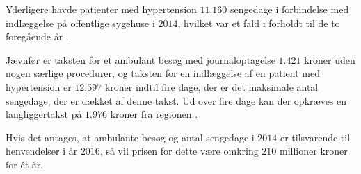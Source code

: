 \noindent
Yderligere havde patienter med hypertension $11.160$ sengedage i forbindelse med indlæggelse på offentlige sygehuse i $2014$, hvilket var et fald i forholdt til de to foregående år \citep{sundhedsdatastyrelsen2016}. 

Jævnfør \citeauthor{takstvejledning2016} er taksten for et ambulant besøg  med journaloptagelse $1.421$ kroner uden nogen særlige procedurer, og taksten for en indlæggelse af en patient med hypertension er $12.597$ kroner indtil fire dage, der er det maksimale antal sengedage, der er dækket af denne takst. Ud over fire dage kan der opkræves en langliggertakst på $1.976$ kroner fra regionen \citep{takstvejledning2016}. 

Hvis det antages, at ambulante besøg og antal sengedage i $2014$ er tilsvarende til henvendelser i år $2016$, så vil prisen for dette være omkring $210$ millioner kroner for ét år. 